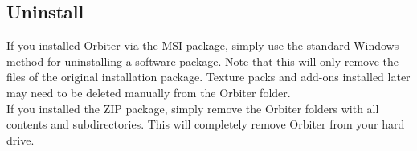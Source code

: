 \documentclass[Orbiter User Manual.tex]{subfiles}
\begin{document}
\noindent
{}

\subsection{Uninstall}
If you installed Orbiter via the MSI package, simply use the standard Windows method for uninstalling a software package. Note that this will only remove the files of the original installation package. Texture packs and add-ons installed later may need to be deleted manually from the Orbiter folder.\\
If you installed the ZIP package, simply remove the Orbiter folders with all contents and subdirectories. This will completely remove Orbiter from your hard drive.
\end{document}
